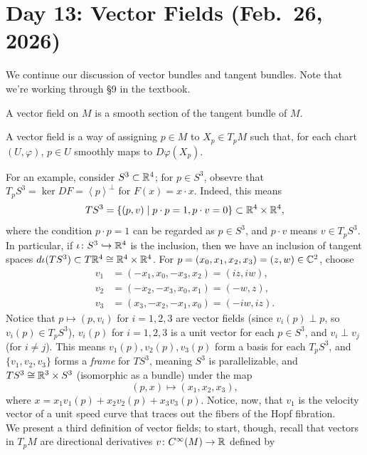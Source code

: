 \section{Day 13: Vector Fields (Feb.\ 26, 2026)}
We continue our discussion of vector bundles and tangent bundles. Note that we're working through \S 9 in the textbook.
\begin{definition}[Global]
    A vector field on $M$ is a smooth section of the tangent bundle of $M$.
\end{definition}
\begin{definition}
    A vector field is a way of assigning $p \in M$ to $X_p \in T_p M$ such that, for each chart $(U, \varphi)$, $p \in U$ smoothly maps to $D \varphi(X_p)$.
\end{definition}
For an example, consider $S^3 \subset \mathbb R^4$; for $p \in S^3$, obsevre that $T_p S^3 = \ker DF = \left<p\right>^\perp$ for $F(x) = x \cdot x$. Indeed, this means
\[ T S^3 = \{(p, v) \mid p \cdot p = 1, p \cdot v = 0\} \subset \mathbb R^4 \times \mathbb R^4, \]
where the condition $p \cdot p = 1$ can be regarded as $p \in S^3$, and $p \cdot v$ means $v \in T_p S^3$. In particular, if $\iota \colon S^3 \hookrightarrow \mathbb R^4$ is the inclusion, then we have an inclusion of tangent spaces $d\iota(TS^3) \subset T\mathbb R^4 \cong \mathbb R^4 \times \mathbb R^4$. For $p = (x_0, x_1, x_2, x_3) = (z, w) \in \mathbb C^2$, choose
\begin{align*}
    v_1 &= (-x_1, x_0, -x_3, x_2) = (iz, iw), \\
    v_2 &= (-x_2, -x_3, x_0, x_1) = (-w, z), \\
    v_3 &= (x_3, -x_2, -x_1, x_0) = (-iw, iz).
\end{align*}
Notice that $p \mapsto (p, v_i)$ for $i = 1, 2, 3$ are vector fields (since $v_i(p) \perp p$, so $v_i(p) \in T_p S^3$), $v_i(p)$ for $i = 1, 2, 3$ is a unit vector for each $p \in S^3$, and $v_i \perp v_j$ (for $i \neq j$). This means $v_1(p), v_2(p), v_3(p)$ form a basis for each $T_p S^3$, and $\{v_1, v_2, v_3\}$ forms a \textit{frame} for $TS^3$, meaning $S^3$ is parallelizable, and $TS^3 \cong \mathbb R^3 \times S^3$ (isomorphic as a bundle) under the map
\[ (p, x) \mapsto (x_1, x_2, x_3), \]
where $x = x_1 v_1(p) + x_2 v_2(p) + x_3 v_3(p)$. Notice, now, that $v_1$ is the velocity vector of a unit speed curve that traces out the fibers of the Hopf fibration.
\\[8pt]
We present a third definition of vector fields; to start, though, recall that vectors in $T_p M$ are directional derivatives $v \colon C^\infty(M) \to \mathbb R$ defined by
